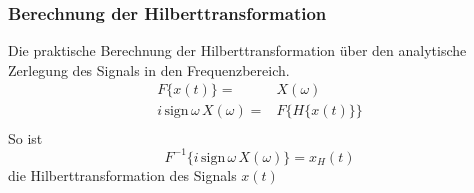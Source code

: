 \subsubsection*{Berechnung der Hilberttransformation}
Die praktische Berechnung der Hilberttransformation über den analytische Zerlegung des Signals in den Frequenzbereich.
\[
\begin{split}
F\{x(t)\} = & X(\omega)\\
i\,\mbox{sign}\,\omega\,X(\omega) = &F\{H\{x(t)\}\}\\
\end{split}
\]
So ist
\[
F^{-1}\{i\,\mbox{sign}\,\omega\,X(\omega)\} = x_H(t)
\]
die Hilberttransformation des Signals $x(t)$ 